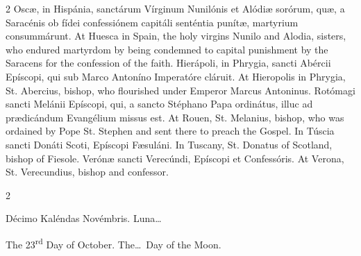 \begin{paracol}{2}
Oscæ, in Hispánia, 
 sanctárum Vírginum Nunilónis et Alódiæ sorórum, quæ, a Saracénis ob fídei 
 confessiónem capitáli senténtia punítæ, martyrium consummárunt.
\switchcolumn
{}
At Huesca in Spain, the holy virgins 
 Nunilo and Alodia, sisters, who endured martyrdom by being condemned to 
 capital punishment by the Saracens for the confession of the faith.
\switchcolumn*
{}
Hierápoli, in Phrygia, 
 sancti Abércii Epíscopi, qui sub Marco Antoníno Imperatóre cláruit.
\switchcolumn
{}
At Hieropolis in Phrygia, St. 
 Abercius, bishop, who flourished under Emperor Marcus Antoninus.
\switchcolumn*
{}
Rotómagi sancti Melánii 
 Epíscopi, qui, a sancto Stéphano Papa ordinátus, illuc ad prædicándum 
 Evangélium missus est.
\switchcolumn
{}
At Rouen, St. Melanius, bishop, who 
 was ordained by Pope St. Stephen and sent there to preach the Gospel.
\switchcolumn*
{}
In Túscia sancti Donáti 
 Scoti, Epíscopi Fæsuláni.
\switchcolumn
{}
In Tuscany, St. Donatus of Scotland, 
 bishop of Fiesole.
\switchcolumn*
{}
Verónæ sancti Verecúndi, 
 Epíscopi et Confessóris.
\switchcolumn
{}
At Verona, St. Verecundius, bishop 
 and confessor.
\switchcolumn*
{}
\end{paracol}


\begin{paracol}{2}
\begin{center}{\color{gregoriocolor} Décimo Kaléndas Novémbris. 
 Luna\dots\ }\end{center}
\switchcolumn
{}
\begin{center}{\color{gregoriocolor} The 
 23\textsuperscript{rd} Day of 
 October. The\dots\ Day of the Moon.}\end{center}
\end{paracol}

